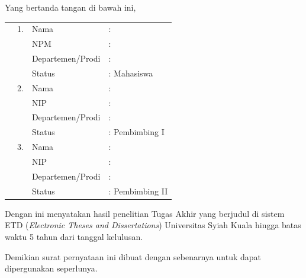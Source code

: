 \spernyataan %

\noindent
Yang bertanda tangan di bawah ini,
\vspace{-0.1cm}
\begin{table}[H]
{\renewcommand{\arraystretch}{0.7}
\begin{tabular}{M{0.6cm}lll}
    &1. 	& Nama   		&: \penulis \\
    &	& NPM       			&: \npm   \\
    &	& Departemen/Prodi   		&: \prodi \\
    &	& Status 				&: Mahasiswa \\  
    &2. 	& Nama  		&: \pembimbingSatu \\
    &	& NIP       			&: \nipPembimbingSatu    \\
    &	& Departemen/Prodi   		&: \prodi \\
    &	& Status 				&: Pembimbing I \\  
    &3. 	& Nama  		&: \pembimbingDua \\
    &	& NIP       			&: \nipPembimbingDua  \\
    &	& Departemen/Prodi   		&: \prodiPembimbingDua \\
    &	& Status 				&: Pembimbing II   
\end{tabular}
}
\end{table}
\vspace{-0.4cm}
\noindent
Dengan ini menyatakan hasil penelitian Tugas Akhir yang berjudul \textbf{\MakeUppercase{\judul}} di sistem ETD (\textit{Electronic Theses and Dissertations}) Universitas Syiah Kuala hingga batas waktu 5 tahun dari tanggal kelulusan.

\vspace{0.4cm}
\noindent
Demikian surat pernyataan ini dibuat dengan sebenarnya untuk dapat dipergunakan seperlunya.

